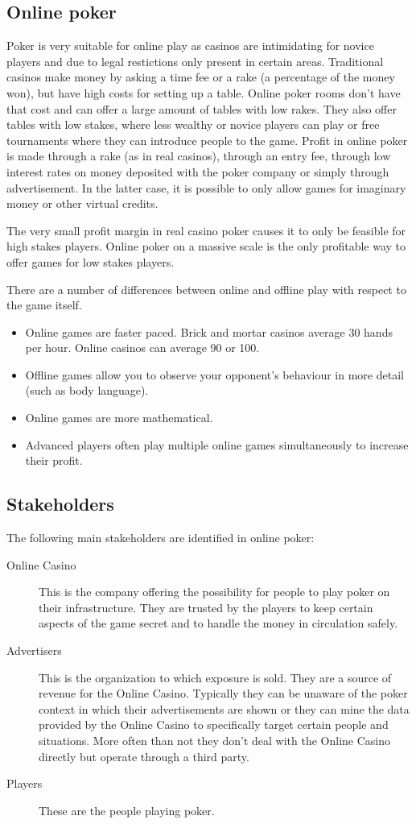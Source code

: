 \documentclass[a4paper,11pt]{report}
\begin{document}
\subsection{Online poker}
Poker is very suitable for online play as casinos are intimidating for novice players and due to legal restictions only present in certain areas. Traditional casinos make money by asking a time fee or a rake (a percentage of the money won), but have high costs for setting up a table. Online poker rooms don't have that cost and can offer a large amount of tables with low rakes. They also offer tables with low stakes, where less wealthy or novice players can play or free tournaments where they can introduce people to the game.
Profit in online poker is made through a rake (as in real casinos), through an entry fee, through low interest rates on money deposited with the poker company or simply through advertisement. In the latter case, it is possible to only allow games for imaginary money or other virtual credits. 

The very small profit margin in real casino poker causes it to only be feasible for high stakes players. Online poker on a massive scale is the only profitable way to offer games for low stakes players.

There are a number of differences between online and offline play with respect to the game itself.
\begin{itemize}
 \item Online games are faster paced. Brick and mortar casinos average 30 hands per hour. Online casinos can average 90 or 100.
 \item Offline games allow you to observe your opponent's behaviour in more detail (such as body language).
 \item Online games are more mathematical.
 \item Advanced players often play multiple online games simultaneously to increase their profit.
\end{itemize}

\subsection{Stakeholders}
The following main stakeholders are identified in online poker:
\begin{description}
 \item[Online Casino] This is the company offering the possibility for people to play poker on their infrastructure. They are trusted by the players to keep certain aspects of the game secret and to handle the money in circulation safely.
 \item[Advertisers] This is the organization to which exposure is sold. They are a source of revenue for the Online Casino. Typically they can be unaware of the poker context in which their advertisements are shown or they can mine the data provided by the Online Casino to specifically target certain people and situations. More often than not they don't deal with the Online Casino directly but operate through a third party.
 \item[Players] These are the people playing poker.
 \end{description}
\end{document}

